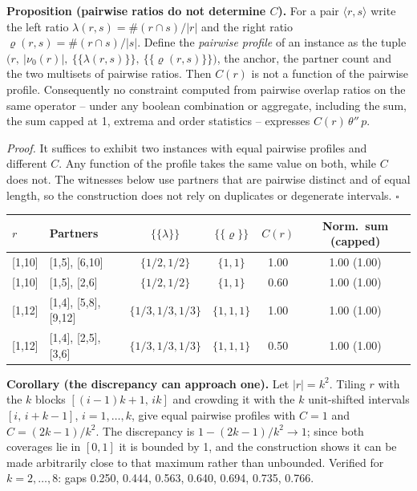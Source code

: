 \documentclass[10pt]{article}
\begin{document}
\textbf{Proposition (pairwise ratios do not determine $C$).} For a pair $\langle r,s\rangle$ write the left ratio $\lambda(r,s)=\#(r\cap s)/|r|$ and the right ratio $\varrho(r,s)=\#(r\cap s)/|s|$. Define the \emph{pairwise profile} of an instance as the tuple $\big(r,\ |\nu_0(r)|,\ \{\!\{\lambda(r,s)\}\!\},\ \{\!\{\varrho(r,s)\}\!\}\big)$, the anchor, the partner count and the two multisets of pairwise ratios. Then $C(r)$ is not a function of the pairwise profile. Consequently no constraint computed from pairwise overlap ratios on the same operator -- under any boolean combination or aggregate, including the sum, the sum capped at 1, extrema and order statistics -- expresses $C(r)\,\theta''\,p$.

\emph{Proof.} It suffices to exhibit two instances with equal pairwise profiles and different $C$. Any function of the profile takes the same value on both, while $C$ does not. The witnesses below use partners that are pairwise distinct and of equal length, so the construction does not rely on duplicates or degenerate intervals. \hfill$\square$

\begin{center}\footnotesize
\begin{tabular}{@{}llcccc@{}}
\toprule
$r$ & Partners & $\{\!\{\lambda\}\!\}$ & $\{\!\{\varrho\}\!\}$ & $C(r)$ & Norm.\ sum (capped) \\
\midrule
{}[1,10] & [1,5], [6,10]            & $\{1/2,1/2\}$ & $\{1,1\}$ & 1.00 & 1.00 (1.00) \\
{}[1,10] & [1,5], [2,6]             & $\{1/2,1/2\}$ & $\{1,1\}$ & 0.60 & 1.00 (1.00) \\
{}[1,12] & [1,4], [5,8], [9,12]     & $\{1/3,1/3,1/3\}$ & $\{1,1,1\}$ & 1.00 & 1.00 (1.00) \\
{}[1,12] & [1,4], [2,5], [3,6]      & $\{1/3,1/3,1/3\}$ & $\{1,1,1\}$ & 0.50 & 1.00 (1.00) \\
\bottomrule
\end{tabular}\end{center}

\textbf{Corollary (the discrepancy can approach one).} Let $|r|=k^2$. Tiling $r$ with the $k$ blocks $[(i-1)k+1,\,ik]$ and crowding it with the $k$ unit-shifted intervals $[i,\,i+k-1]$, $i=1,\dots,k$, give equal pairwise profiles with $C=1$ and $C=(2k-1)/k^2$. The discrepancy is $1-(2k-1)/k^2\to 1$; since both coverages lie in $[0,1]$ it is bounded by 1, and the construction shows it can be made arbitrarily close to that maximum rather than unbounded. Verified for $k=2,\dots,8$: gaps 0.250, 0.444, 0.563, 0.640, 0.694, 0.735, 0.766.
\end{document}
